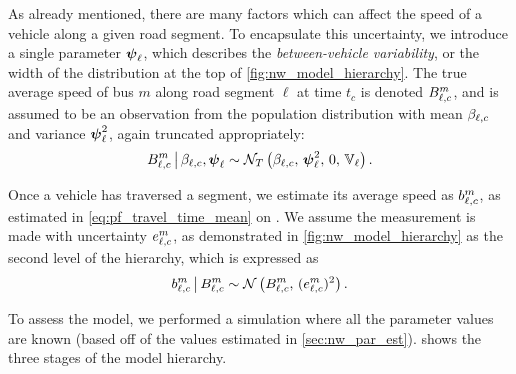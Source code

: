 As already mentioned, there are many factors which can affect the speed of a vehicle along a given road segment. To encapsulate this uncertainty, we introduce a single parameter $\mathbf{\boldsymbol{\psi}}_{\ell}$, which describes the \emph{between-vehicle variability}, or the width of the distribution at the top of \cref{fig:nw_model_hierarchy}. The true average speed of bus $m$ along road segment $\ell$ at time $t_c$ is denoted $B_{\ell,c}^m$, and is assumed to be an observation from the population distribution with mean $\beta_{\ell,c}$ and variance $\mathbf{\boldsymbol{\psi}}_{\ell}^2$, again truncated appropriately:
\begin{equation}\label{eq:nw_vehicle_tt}
B_{\ell,c}^m \,\big|\, \beta_{\ell,c}, \mathbf{\boldsymbol{\psi}}_\ell \sim
\mathcal{N}_T\left(\beta_{\ell,c},\, \mathbf{\boldsymbol{\psi}}_{\ell}^2,\, 0,\, \mathbb{V}_\ell\right).
\end{equation}


Once a vehicle has traversed a segment, we estimate its average speed as $b_{\ell,c}^m$, as estimated in \cref{eq:pf_travel_time_mean} on . We assume the measurement is made with uncertainty $e_{\ell,c}^m$, as demonstrated in \cref{fig:nw_model_hierarchy} as the second level of the hierarchy, which is expressed as
\begin{equation}\label{eq:nw_tt_obs_dist}
b_{\ell,c}^m \,\big|\, B_{\ell,c}^m \sim \mathcal{N}\left(B_{\ell,c}^m,\, (e_{\ell,c}^m)^2\right).
\end{equation}



To assess the model, we performed a simulation where all the parameter values are known (based off of the values estimated in \cref{sec:nw_par_est}).  shows the three stages of the model hierarchy.


